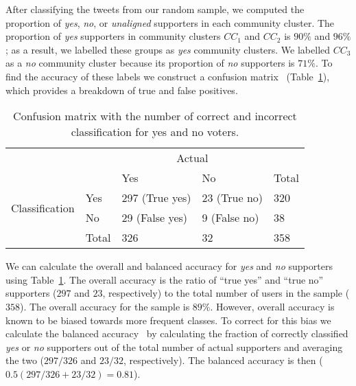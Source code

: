 \documentclass{article}
\begin{document}
After classifying the tweets from our random sample, we computed the
proportion of {\it yes}, {\it no}, or {\it unaligned} supporters in
each community cluster. The proportion of {\it yes} supporters in
community clusters $CC_1$ and $CC_2$ is $90\%$ and $96\%$; as a
result, we labelled these groups as {\it yes} community clusters.  We
labelled $CC_3$ as a {\it no} community cluster because its proportion
of {\it no} supporters is $71\%$.  To find the accuracy of these
labels we construct a confusion matrix~\cite{brodersen2010balanced}
(Table~\ref{tab:conf_yesno}), which provides a breakdown of true and
false positives.

\begin{table}[tp]
\centering
\begin{tabular}{ll|ll|l}
  & \multicolumn{1}{c|}{} & \multicolumn{2}{c|}{Actual}
  & \multicolumn{1}{l}{} \\
  & & Yes & No & Total  \\ \hline
\multirow{2}{*}{Classification} & Yes & 297 (True yes) & 23 (True no) & 320 \\
 & No  & 29 (False yes) & 9 (False no) & 38 \\ \hline
 & Total & 326 & 32  & 358                 
\end{tabular}
\caption{Confusion matrix with the number of correct and incorrect
  classification for yes and no voters.}
\label{tab:conf_yesno}
\end{table}

We can calculate the overall and balanced accuracy for {\it yes} and
{\it no} supporters using Table~\ref{tab:conf_yesno}. The overall
accuracy is the ratio of ``true yes'' and ``true no'' supporters
($297$ and $23$, respectively) to the total number of users in the
sample ($358$). The overall accuracy for the sample is $89\%$.
However, overall accuracy is known to be biased towards more frequent
classes. To correct for this bias we calculate the balanced
accuracy~\cite{brodersen2010balanced} by calculating the fraction of
correctly classified {\it yes} or {\it no} supporters out of the total
number of actual supporters and averaging the two ($297/326$ and
$23/32$, respectively). The balanced accuracy is then ($0.5(297/326 +
23/32) = 0.81$).
\end{document}
